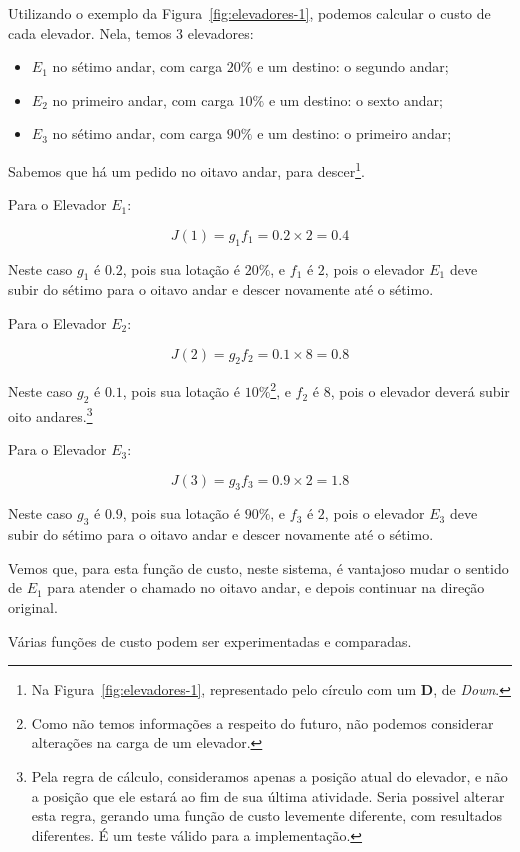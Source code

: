 Utilizando o exemplo da Figura~\ref{fig:elevadores-1}, podemos calcular o custo
de cada elevador. Nela, temos 3 elevadores:

\begin{itemize}
\item \textbf{$E_{1}$} no sétimo andar, com carga $20\%$ e um destino: o segundo andar;
\item \textbf{$E_{2}$} no primeiro andar, com carga $10\%$ e um destino: o sexto andar;
\item \textbf{$E_{3}$} no sétimo andar, com carga $90\%$ e um destino: o primeiro andar;
\end{itemize}

Sabemos que há um pedido no oitavo andar, para descer\footnote{Na
  Figura~\ref{fig:elevadores-1}, representado pelo círculo com um \textbf{D}, de
\textit{Down}.}.

Para o Elevador $E_{1}$:

\[J(1) = g_{1}f_{1} = 0.2 \times 2 = 0.4\]

Neste caso $g_{1}$ é $0.2$, pois sua lotação é $20\%$, e $f_{1}$ é $2$, pois o elevador
$E_{1}$ deve subir do sétimo para o oitavo andar e descer novamente até o sétimo.

Para o Elevador $E_{2}$:

\[J(2) = g_{2}f_{2} = 0.1 \times 8 = 0.8\]

Neste caso $g_{2}$ é $0.1$, pois sua lotação é $10\%$\footnote{Como não temos informações a
respeito do futuro, não podemos considerar alterações na carga de um elevador.},
e $f_{2}$ é $8$, pois o elevador deverá subir oito andares.\footnote{Pela regra
de cálculo, consideramos apenas a posição atual do elevador, e não a posição que
ele estará ao fim de sua última atividade. Seria possivel alterar esta regra,
gerando uma função de custo levemente diferente, com resultados diferentes. É um
teste válido para a implementação.}

Para o Elevador $E_{3}$:

\[J(3) = g_{3}f_{3} = 0.9 \times 2 = 1.8\]

Neste caso $g_{3}$ é $0.9$, pois sua lotação é $90\%$, e $f_{3}$ é $2$, pois o elevador
$E_{3}$ deve subir do sétimo para o oitavo andar e descer novamente até o sétimo.

Vemos que, para esta função de custo, neste sistema, é vantajoso mudar o sentido
de $E_{1}$ para atender o chamado no oitavo andar, e depois continuar na direção original.

Várias funções de custo podem ser experimentadas e comparadas.

